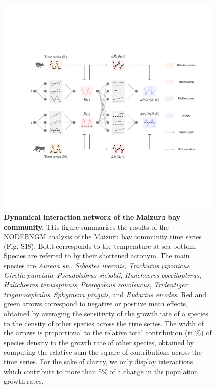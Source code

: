 \documentclass[11pt, oneside]{article}
\begin{document}
\newpage
\begin{figure}[H]
\begin{center}
\includegraphics[width=\linewidth,page=8]{figures/main.pdf}
\caption{
    \textbf{Dynamical interaction network of the Maizuru bay community.}
    This figure summarises the results of the NODEBNGM analysis of the Maizuru bay community time series (Fig. S18). 
    Bot.t corresponds to the temperature at sea bottom. Species are referred to by their shortened acronym.
    The main species are \textit{Aurelia sp.}, \textit{Sebastes inermis}, \textit{Trachurus japonicus}, \textit{Girella punctata}, \textit{Pseudolabrus sieboldi}, \textit{Halichoeres poecilopterus}, \textit{Halichoeres tenuispinnis}, \textit{Pterogobius zonoleucus}, \textit{Tridentiger trigonocephalus}, \textit{Sphyraena pinguis}, and \textit{Rudarius ercodes}.
    Red and green arrows correspond to negative or positive mean effects, obtained by averaging the sensitivity of the growth rate of a species to the density of other species across the time series. 
    The width of the arrows is proportional to the relative total contribution (in \%) of species density to the growth rate of other species, obtained by computing the relative sum the square of contributions across the time series.
    For the sake of clarity, we only display interactions which contribute to more than 5\% of a change in the population growth rates.
}
\end{center}
\end{figure}
\newpage
\end{document}
